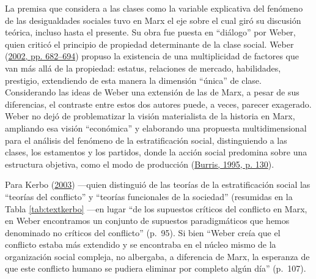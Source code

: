 \documentclass[
]{article}
\begin{document}
La premisa que considera a las clases como la variable explicativa del fenómeno de las desigualdades sociales tuvo en Marx el eje sobre el cual giró su discusión teórica, incluso hasta el presente. Su obra fue puesta en ``diálogo'' por Weber, quien criticó el principio de propiedad determinante de la clase social. Weber (\protect\hyperlink{ref-Weber2002}{2002, pp. 682--694}) propuso la existencia de una multiplicidad de factores que van más allá de la propiedad: estatus, relaciones de mercado, habilidades, prestigio, extendiendo de esta manera la dimensión ``única'' de clase. Considerando las ideas de Weber una extensión de las de Marx, a pesar de sus diferencias, el contraste entre estos dos autores puede, a veces, parecer exagerado. Weber no dejó de problematizar la visión materialista de la historia en Marx, ampliando esa visión ``económica'' y elaborando una propuesta multidimensional para el análisis del fenómeno de la estratificación social, distinguiendo a las clases, los estamentos y los partidos, donde la acción social predomina sobre una estructura objetiva, como el modo de producción (\protect\hyperlink{ref-Burris1995}{Burris, 1995, p. 130}).

Para Kerbo (\protect\hyperlink{ref-Kerbo2003}{2003}) ---quien distinguió de las teorías de la estratificación social las ``teorías del conflicto'' y ``teorías funcionales de la sociedad'' (resumidas en la Tabla \ref{tab:textkerbo} ---en lugar ``de los supuestos críticos del conflicto en Marx, en Weber encontramos un conjunto de supuestos paradigmáticos que hemos denominado no críticos del conflicto'' (p.~95). Si bien ``Weber creía que el conflicto estaba más extendido y se encontraba en el núcleo mismo de la organización social compleja, no albergaba, a diferencia de Marx, la esperanza de que este conflicto humano se pudiera eliminar por completo algún día'' (p.~107).

\providecommand{\docline}[3]{\noalign{\global\setlength{\arrayrulewidth}{#1}}\arrayrulecolor[HTML]{#2}\cline{#3}}

\setlength{\tabcolsep}{2pt}

\renewcommand*{\arraystretch}{1.5}
\end{document}

